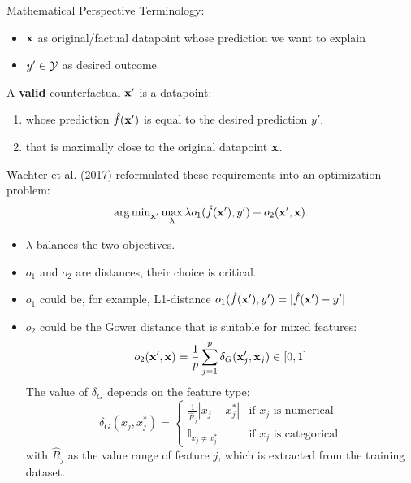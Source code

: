 \documentclass[11pt,compress,t,notes=noshow, xcolor=table]{beamer}
\begin{document}
\begin{vbframe}{Mathematical Perspective}
	Terminology: 
	\begin{itemize}
		\item $\xv$ as original/factual datapoint whose prediction we want to explain
		\item $y' \in \Yspace$ as desired outcome 
	\end{itemize}
	\vspace{0.3cm}
	A \textbf{valid} counterfactual $\xv'$ is a datapoint: 
	\begin{enumerate}
		\item whose prediction $\fh(\xv')$ is equal to the desired prediction $y'$. 
		\item that is maximally close to the original datapoint $\xv$.
	\end{enumerate}
	Wachter et al. (2017) reformulated these requirements into an optimization problem: 
	\begin{equation}
		\argmin_{\xv'} \max_{\lambda} \lambda o_1(\fh(\xv'), y') + o_2(\xv', \xv).
		\label{eq:wachter}
	\end{equation}
	\begin{itemize}
		\item $\lambda$ balances the two objectives.
		\item $o_1$ and $o_2$ are distances, their choice is critical.
		\framebreak
		\item $o_1$ could be, for example, L1-distance $o_1(\fh(\xv'), y') = |\fh(\xv')-y'|$
		\item $o_2$ could be the Gower distance that is suitable for mixed features: 
		$$o_2(\xv', \xv) = \frac{1}{p}\sum_{j = 1}^{p} \delta_G(\xv'_j, \xv_j)\in [0, 1]$$
		The value of $\delta_G$ depends on the feature type:
		\begin{equation*}
		\delta_G(x_j, x^*_j) = 
		\begin{cases}
		\frac{1}{\widehat{R}_j}|x_j- x^*_j| & \text{if $x_j$ is numerical} \\
		\mathbb{I}_{x_j \neq x_j^*} & \text{if $x_j$ is categorical}
		\end{cases}
		\end{equation*}
		with $\widehat{R}_j$ as the value range of feature $j$, which is extracted from the training dataset. 
	\end{itemize}
\end{vbframe}
\end{document}
